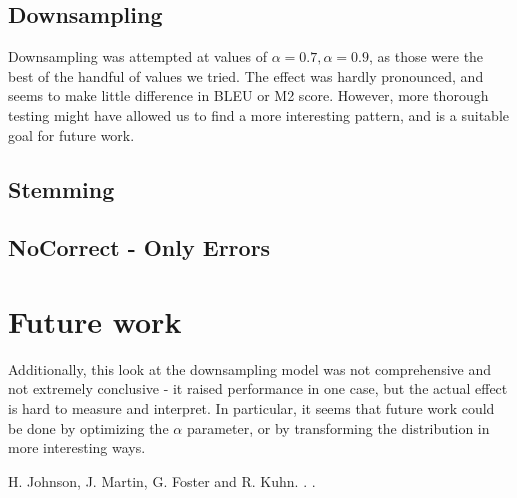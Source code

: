 \documentclass[11pt,letterpaper]{article}
\begin{document}
\subsection{Downsampling}
\indent Downsampling was attempted at values of $\alpha = 0.7, \alpha = 0.9$, as those were the best of the handful of values we tried. 
The effect was hardly pronounced, and seems to make little difference in BLEU or M2 score. However, more thorough testing 
might have allowed us to find a more interesting pattern, and is a suitable goal for future work. \newline
\subsection{Stemming}
\subsection{NoCorrect - Only Errors}


\section{Future work}
\indent Additionally, this look at the downsampling model was not comprehensive and not extremely conclusive - it raised performance in
 one case, but the actual effect is hard to measure and interpret. In particular, it seems that future work could be
  done by optimizing the $\alpha$ parameter, or by transforming the distribution in more interesting ways. \newline


\begin{thebibliography}{}


H. Johnson, J. Martin, G. Foster and R. Kuhn.
.
.

\end{thebibliography}
\end{document}
